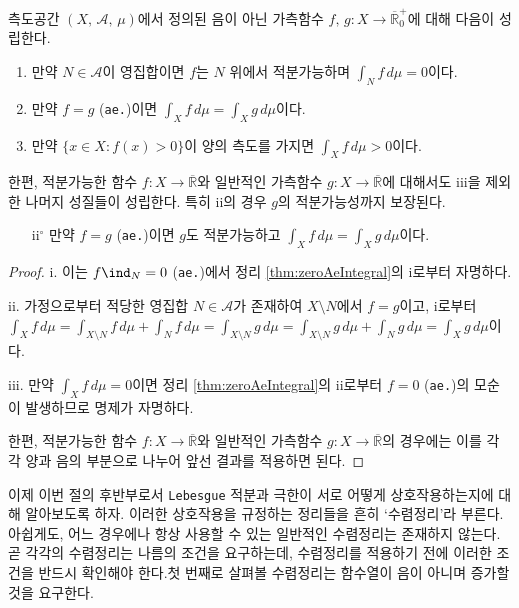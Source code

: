 \begin{corollary}\label{cor:zeroAeIntegral}
    측도공간 $(X,\,\mathcal{A},\,\mu)$에서 정의된 음이 아닌 가측함수 $f,\,g:X\to\overline{\mathbb{R}}^+_0$에 대해 다음이 성립한다.
    \begin{enumerate}
        \item 만약 $N\in\mathcal{A}$이 영집합이면 $f$는 $N$ 위에서 적분가능하며 $\int_Nf\,d\mu=0$이다.
        \item 만약 $f=g$ (\texttt{ae.})이면 $\int_Xf\,d\mu=\int_Xg\,d\mu$이다.
        \item 만약 $\{x\in X:f(x)>0\}$이 양의 측도를 가지면 $\int_Xf\,d\mu>0$이다.
    \end{enumerate}
    한편, 적분가능한 함수 $f:X\to\overline{\mathbb{R}}$와 일반적인 가측함수 $g:X\to\overline{\mathbb{R}}$에 대해서도 iii을 제외한 나머지 성질들이 성립한다. 특히 ii의 경우 $g$의 적분가능성까지 보장된다.
    \begin{enumerate}
        \item[ii$^\circ$] 만약 $f=g$ (\texttt{ae.})이면 $g$도 적분가능하고 $\int_Xf\,d\mu=\int_Xg\,d\mu$이다.
    \end{enumerate}
\end{corollary}

\begin{proof}
    i. 이는 $f\ind_N=0$ (\texttt{ae.})에서 정리 \ref{thm:zeroAeIntegral}의 i로부터 자명하다.

    ii. 가정으로부터 적당한 영집합 $N\in\mathcal{A}$가 존재하여 $X\setminus N$에서 $f=g$이고, i로부터 $\int_Xf\,d\mu=\int_{X\setminus N}f\,d\mu+\int_Nf\,d\mu=\int_{X\setminus N}g\,d\mu=\int_{X\setminus N}g\,d\mu+\int_Ng\,d\mu=\int_Xg\,d\mu$이다.

    iii. 만약 $\int_Xf\,d\mu=0$이면 정리 \ref{thm:zeroAeIntegral}의 ii로부터 $f=0$ (\texttt{ae.})의 모순이 발생하므로 명제가 자명하다.

    한편, 적분가능한 함수 $f:X\to\overline{\mathbb{R}}$와 일반적인 가측함수 $g:X\to\overline{\mathbb{R}}$의 경우에는 이를 각각 양과 음의 부분으로 나누어 앞선 결과를 적용하면 된다.
\end{proof}

이제 이번 절의 후반부로서 \texttt{Lebesgue} 적분과 극한이 서로 어떻게 상호작용하는지에 대해 알아보도록 하자. 이러한 상호작용을 규정하는 정리들을 흔히 `수렴정리'라 부른다. 아쉽게도, 어느 경우에나 항상 사용할 수 있는 일반적인 수렴정리는 존재하지 않는다. 곧 각각의 수렴정리는 나름의 조건을 요구하는데, 수렴정리를 적용하기 전에 이러한 조건을 반드시 확인해야 한다.\footnotemark 첫 번째로 살펴볼 수렴정리는 함수열이 음이 아니며 증가할 것을 요구한다.

